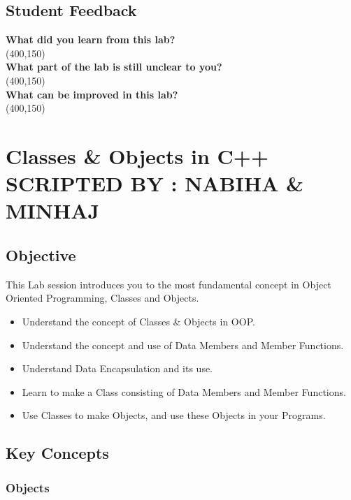 \documentclass[11pt,fleqn]{book} %
\begin{document}
 \newpage
 \section{Student Feedback}
 \textbf{What did you learn from this lab?}\\ 
 \framebox(400,150){}\\
 \textbf{What part of the lab is still unclear to you?}\\
 \framebox(400,150){}\\
 \textbf{What can be improved in this lab?}\\ 
 \framebox(400,150){}\\
 
\newpage

\chapter{Classes \& Objects in C++ \hspace{14mm} {\textsc{\small SCRIPTED BY : NABIHA \& MINHAJ}}}

\section{Objective}

This Lab session introduces you to the most fundamental concept in Object Oriented Programming, Classes and Objects.

\begin{itemize}
    \item Understand the concept of Classes \& Objects in OOP.
    \item Understand the concept and use of Data Members and Member Functions.
    \item Understand Data Encapsulation and its use.
    \item Learn to make a Class consisting of Data Members and Member Functions.
    \item Use Classes to make Objects, and use these Objects in your Programs.
\end{itemize}
\section{Key Concepts}

\subsection{Objects}
\end{document}

